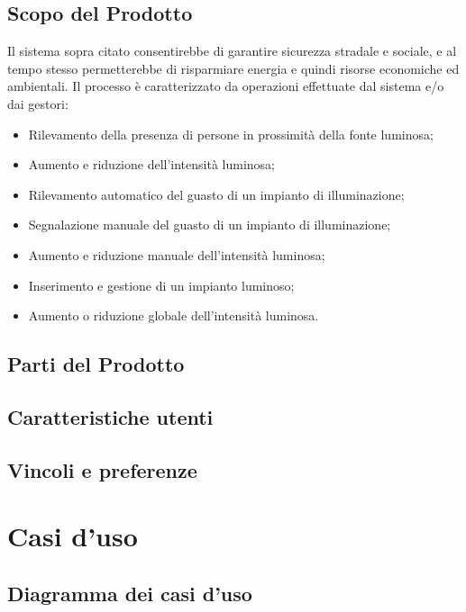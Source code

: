\documentclass[a4paper, 12pt]{article}
\begin{document}
\subsection{Scopo del Prodotto}
Il sistema sopra citato consentirebbe di garantire sicurezza stradale e sociale, e al tempo stesso permetterebbe di risparmiare energia e quindi risorse economiche ed ambientali. Il processo è caratterizzato da operazioni effettuate dal sistema e/o dai gestori:
\begin{itemize}
    \item Rilevamento della presenza di persone in prossimità della fonte luminosa;
    \item Aumento e riduzione dell'intensità luminosa;
    \item Rilevamento automatico del guasto di un impianto di illuminazione;
    \item Segnalazione manuale del guasto di un impianto di illuminazione;
    \item Aumento e riduzione manuale dell'intensità luminosa;
    \item Inserimento e gestione di un impianto luminoso;
    \item Aumento o riduzione globale dell'intensità luminosa. 
\end{itemize}

\subsection{Parti del Prodotto}

\subsection{Caratteristiche utenti}

\subsection{Vincoli e preferenze}

\newpage

\section{Casi d'uso}

\subsection{Diagramma dei casi d'uso}
\end{document}
